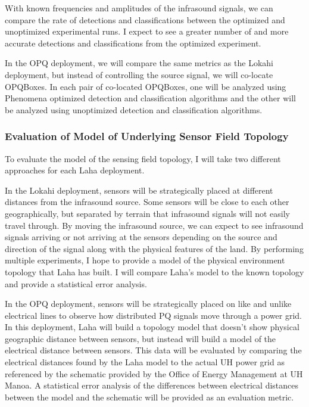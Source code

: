 With known frequencies and amplitudes of the infrasound signals, we can compare the rate of detections and classifications between the optimized and unoptimized experimental runs. I expect to see a greater number of and more accurate detections and classifications from the optimized experiment.

In the OPQ deployment, we will compare the same metrics as the Lokahi deployment, but instead of controlling the source signal, we will co-locate OPQBoxes. In each pair of co-located OPQBoxes, one will be analyzed using Phenomena optimized detection and classification algorithms and the other will be analyzed using unoptimized detection and classification algorithms.

\subsubsection{Evaluation of Model of Underlying Sensor Field Topology}
To evaluate the model of the sensing field topology, I will take two different approaches for each Laha deployment.

In the Lokahi deployment, sensors will be strategically placed at different distances from the infrasound source. Some sensors will be close to each other geographically, but separated by terrain that infrasound signals will not easily travel through. By moving the infrasound source, we can expect to see infrasound signals arriving or not arriving at the sensors depending on the source and direction of the signal along with the physical features of the land. By performing multiple experiments, I hope to provide a model of the physical environment topology that Laha has built. I will compare Laha's model to the known topology and provide a statistical error analysis. 

In the OPQ deployment, sensors will be strategically placed on like and unlike electrical lines to observe how distributed PQ signals move through a power grid. In this deployment, Laha will build a topology model that doesn't show physical geographic distance between sensors, but instead will build a model of the electrical distance between sensors. This data will be evaluated by comparing the electrical distances found by the Laha model to the actual UH power grid as referenced by the schematic provided by the Office of Energy Management at UH Manoa. A statistical error analysis of the differences between electrical distances between the model and the schematic will be provided as an evaluation metric.

